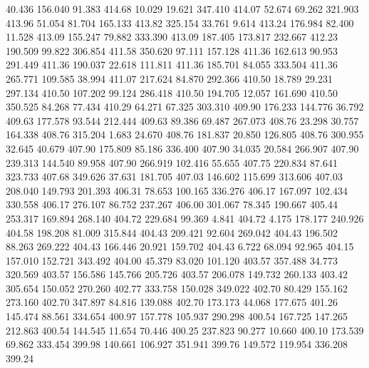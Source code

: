   40.436  156.040   91.383       414.68
  10.029   19.621  347.410       414.07
  52.674   69.262  321.903       413.96
  51.054   81.704  165.133       413.82
 325.154   33.761    9.614       413.24
 176.984   82.400   11.528       413.09
 155.247   79.882  333.390       413.09
 187.405  173.817  232.667       412.23
 190.509   99.822  306.854       411.58
 350.620   97.111  157.128       411.36
 162.613   90.953  291.449       411.36
 190.037   22.618  111.811       411.36
 185.701   84.055  333.504       411.36
 265.771  109.585   38.994       411.07
 217.624   84.870  292.366       410.50
  18.789   29.231  297.134       410.50
 107.202   99.124  286.418       410.50
 194.705   12.057  161.690       410.50
 350.525   84.268   77.434       410.29
  64.271   67.325  303.310       409.90
 176.233  144.776   36.792       409.63
 177.578   93.544  212.444       409.63
  89.386   69.487  267.073       408.76
  23.298   30.757  164.338       408.76
 315.204    1.683   24.670       408.76
 181.837   20.850  126.805       408.76
 300.955   32.645   40.679       407.90
 175.809   85.186  336.400       407.90
  34.035   20.584  266.907       407.90
 239.313  144.540   89.958       407.90
 266.919  102.416   55.655       407.75
 220.834   87.641  323.733       407.68
 349.626   37.631  181.705       407.03
 146.602  115.699  313.606       407.03
 208.040  149.793  201.393       406.31
  78.653  100.165  336.276       406.17
 167.097  102.434  330.558       406.17
 276.107   86.752  237.267       406.00
 301.067   78.345  190.667       405.44
 253.317  169.894  268.140       404.72
 229.684   99.369    4.841       404.72
   4.175  178.177  240.926       404.58
 198.208   81.009  315.844       404.43
 209.421   92.604  269.042       404.43
 196.502   88.263  269.222       404.43
 166.446   20.921  159.702       404.43
   6.722   68.094   92.965       404.15
 157.010  152.721  343.492       404.00
  45.379   83.020  101.120       403.57
 357.488   34.773  320.569       403.57
 156.586  145.766  205.726       403.57
 206.078  149.732  260.133       403.42
 305.654  150.052  270.260       402.77
 333.758  150.028  349.022       402.70
  80.429  155.162  273.160       402.70
 347.897   84.816  139.088       402.70
 173.173   44.068  177.675       401.26
 145.474   88.561  334.654       400.97
 157.778  105.937  290.298       400.54
 167.725  147.265  212.863       400.54
 144.545   11.654   70.446       400.25
 237.823   90.277   10.660       400.10
 173.539   69.862  333.454       399.98
 140.661  106.927  351.941       399.76
 149.572  119.954  336.208       399.24
